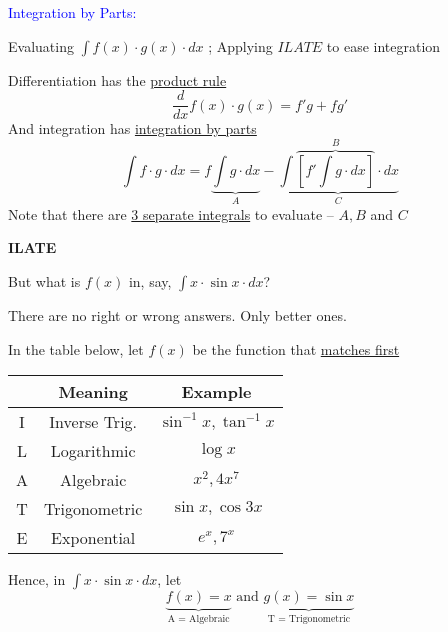 \documentclass[14pt,fleqn]{extarticle}
\begin{document}
\textcolor{blue}{Integration by Parts:} 

Evaluating $\int f(x)\cdot g(x)\cdot dx$ ; Applying $ILATE$ to ease integration

\newcard 

Differentiation has the \underline{product rule}
\[ \frac{d}{dx} f(x)\cdot g(x) = f'g + fg ' \]
And integration has \underline{integration by parts}
\[ \int f\cdot g\cdot dx = f\underbrace{\int g\cdot dx}_A - \underbrace{\int \overbrace{\left[f'\int g\cdot dx \right]}^B\cdot dx}_{C}\]
Note that there are \underline{3 separate integrals} to evaluate -- $A,B$ and $C$\newline 

\textbf{ILATE}

But what is $f(x)$ in, say, $\int x\cdot\sin x\cdot dx$?  

There are no right or wrong answers. Only better ones.\newline 

In the table below, let \underline{$f(x)$} be the function that \underline{matches first}

\begin{tabular}{c|c|c}
\hline
	 & Meaning & Example\\
\hline
	I & Inverse Trig. & $\sin^{-1} x, \tan^{-1} x$ \\
\hline
	L & Logarithmic & $\log x$\\
\hline
	A & Algebraic & $x^2, 4x^7$ \\
\hline
	T & Trigonometric & $\sin x, \cos 3x$ \\
\hline
	E & Exponential & $e^x, 7^x$\\
\hline
\end{tabular}\newline 

Hence, in $\int x\cdot\sin x\cdot dx$, let 
\[ \underbrace{f(x) = x}_{\text{A = Algebraic}}\text{ and } \underbrace{g(x) = \sin x}_{\text{T = Trigonometric}} \]
\end{document}
